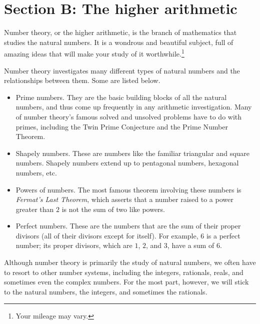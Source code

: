 \section*{Section B: The higher arithmetic}
Number theory, or the higher arithmetic, is the
branch of mathematics that studies the natural numbers.
It is a wondrous and beautiful subject, full of
amazing ideas that will make your study of it
worthwhile.\footnote{Your mileage may vary.}

Number theory investigates many different
types of natural numbers and the relationships
between them. Some are listed below.
  \begin{itemize}
  \item Prime numbers. They are the basic building
    blocks of all the natural numbers, and thus
    come up frequently in any arithmetic investigation.
    Many of number theory's famous solved and unsolved problems
    have to do with primes, including the Twin Prime Conjecture
    and the Prime Number Theorem.
  \item Shapely numbers. These are numbers like the familiar triangular and
    square numbers. Shapely numbers
    extend up to pentagonal numbers, hexagonal numbers, etc.
  \item Powers of numbers. The most famous theorem involving
    these numbers is \emph{Fermat's Last Theorem}, which asserts
    that a number raised to a power greater than \(2\) is not
    the sum of two like powers.
  \item Perfect numbers. These are the numbers that are
    the sum of their proper divisors (all of their divisors except for itself).
    For example, \(6\) is a perfect number; its proper divisors, which are \(1\), \(2\),
    and \(3\), have a sum of \(6\).
    
  \end{itemize}
  Although number theory is primarily the study of natural numbers, we often
  have to resort to other number systems, including the integers, rationals, reals,
  and sometimes even the complex numbers. For the most part, however, we will
  stick to the natural numbers, the integers, and sometimes the rationals.

